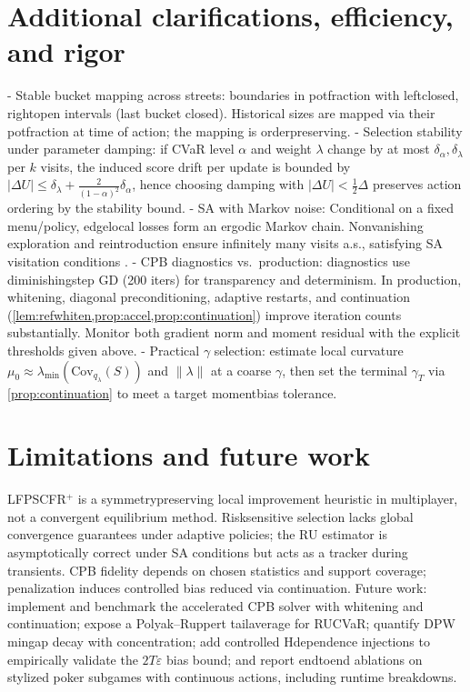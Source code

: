 \begin{adjustbox}{width=\linewidth}
\begin{minipage}{\linewidth}
\small

\end{minipage}
\end{adjustbox}

\section{Additional clarifications, efficiency, and rigor}
- Stable bucket mapping across streets: boundaries in pot\textendash fraction with left\textendash closed, right\textendash open intervals (last bucket closed). Historical sizes are mapped via their pot\textendash fraction at time of action; the mapping is order\textendash preserving.
- Selection stability under parameter damping: if CVaR level $\alpha$ and weight $\lambda$ change by at most $\delta_\alpha,\delta_\lambda$ per $k$ visits, the induced score drift per update is bounded by $|\Delta U|\le \delta_\lambda + \frac{2}{(1-\alpha)^2}\delta_\alpha$, hence choosing damping with $|\Delta U|<\tfrac{1}{2}\Delta$ preserves action ordering by the stability bound.
- SA with Markov noise: Conditional on a fixed menu/policy, edge\textendash local losses form an ergodic Markov chain. Nonvanishing exploration and reintroduction ensure infinitely many visits a.s., satisfying SA visitation conditions \cite{borkar2008sa,kushner2003sa}.
- CPB diagnostics vs.\ production: diagnostics use diminishing\textendash step GD (200 iters) for transparency and determinism. In production, whitening, diagonal preconditioning, adaptive restarts, and continuation (\cref{lem:refwhiten,prop:accel,prop:continuation}) improve iteration counts substantially. Monitor both gradient norm and moment residual with the explicit thresholds given above.
- Practical $\gamma$ selection: estimate local curvature $\mu_0\approx \lambda_{\min}(\mathrm{Cov}_{q_{\lambda}}(S))$ and $\|\lambda\|$ at a coarse $\gamma$, then set the terminal $\gamma_T$ via \cref{prop:continuation} to meet a target moment\textendash bias tolerance.

\section{Limitations and future work}
LF\textendash PS\textendash CFR$^+$ is a symmetry\textendash preserving local improvement heuristic in multiplayer, not a convergent equilibrium method. Risk\textendash sensitive selection lacks global convergence guarantees under adaptive policies; the RU estimator is asymptotically correct under SA conditions but acts as a tracker during transients. CPB fidelity depends on chosen statistics and support coverage; penalization induces controlled bias reduced via continuation. Future work: implement and benchmark the accelerated CPB solver with whitening and continuation; expose a Polyak–Ruppert tail\textendash average for RU\textendash CVaR; quantify DPW min\textendash gap decay with concentration; add controlled H\textendash dependence injections to empirically validate the $2T\varepsilon$ bias bound; and report end\textendash to\textendash end ablations on stylized poker subgames with continuous actions, including runtime breakdowns.

